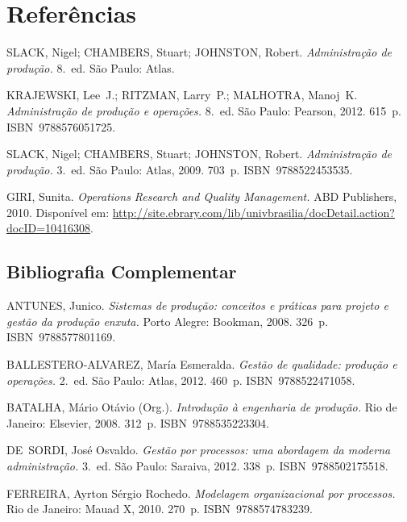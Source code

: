 \documentclass[12pt, a4paper]{article}
\begin{document}
\newpage
\section*{Referências}

\begin{description}[leftmargin=0pt, labelwidth=0pt, itemsep=6pt]

  \item SLACK, Nigel; CHAMBERS, Stuart; JOHNSTON, Robert.
    \textit{Administração de produção.} 8.~ed. São Paulo: Atlas.

  \item KRAJEWSKI, Lee~J.; RITZMAN, Larry~P.; MALHOTRA, Manoj~K.
    \textit{Administração de produção e operações.} 8.~ed.
    São Paulo: Pearson, 2012. 615~p.
    ISBN~9788576051725.

  \item SLACK, Nigel; CHAMBERS, Stuart; JOHNSTON, Robert.
    \textit{Administração de produção.} 3.~ed.
    São Paulo: Atlas, 2009. 703~p.
    ISBN~9788522453535.

  \item GIRI, Sunita.
    \textit{Operations Research and Quality Management.}
    ABD Publishers, 2010.
    Disponível em: \url{http://site.ebrary.com/lib/univbrasilia/docDetail.action?docID=10416308}.

\end{description}

\subsection*{Bibliografia Complementar}

\begin{description}[leftmargin=0pt, labelwidth=0pt, itemsep=6pt]

  \item ANTUNES, Junico.
    \textit{Sistemas de produção: conceitos e práticas para projeto e gestão da produção enxuta.}
    Porto Alegre: Bookman, 2008. 326~p.
    ISBN~9788577801169.

  \item BALLESTERO-ALVAREZ, María Esmeralda.
    \textit{Gestão de qualidade: produção e operações.}
    2.~ed. São Paulo: Atlas, 2012. 460~p.
    ISBN~9788522471058.

  \item BATALHA, Mário Otávio (Org.).
    \textit{Introdução à engenharia de produção.}
    Rio de Janeiro: Elsevier, 2008. 312~p.
    ISBN~9788535223304.

  \item DE~SORDI, José Osvaldo.
    \textit{Gestão por processos: uma abordagem da moderna administração.}
    3.~ed. São Paulo: Saraiva, 2012. 338~p.
    ISBN~9788502175518.

  \item FERREIRA, Ayrton Sérgio Rochedo.
    \textit{Modelagem organizacional por processos.}
    Rio de Janeiro: Mauad X, 2010. 270~p.
    ISBN~9788574783239.

\end{description}
\end{document}
